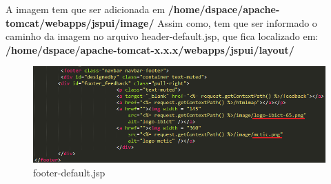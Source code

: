 \documentclass[12pt,hidelinks]{article}
\begin{document}
\newpage 
A imagem tem que ser adicionada em \textbf{/home/dspace/apache-tomcat/webapps/jspui/image/} 
Assim como, tem que ser informado o caminho da imagem no arquivo header-default.jsp, que fica localizado em:  \textbf{/home/dspace/apache-tomcat-x.x.x/webapps/jspui/layout/}
    \begin{figure}[!htp]
        \centering
        \includegraphics[scale=0.5]{figura/footer-default.png}
        \caption{footer-default.jsp}
        \label{Rotulo}
    \end{figure}
    
\end{document}
